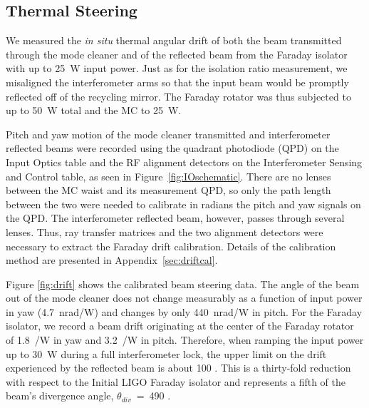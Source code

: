 \subsection{Thermal Steering}
We measured the \emph{in situ} thermal angular drift of both the beam
transmitted through the mode cleaner and of the reflected beam from
the Faraday isolator with up to 25~W input power. Just as for the
isolation ratio measurement, we misaligned the interferometer arms so
that the input beam would be promptly reflected off of the recycling
mirror. The Faraday rotator was thus subjected to up to 50~W total
and the MC to 25~W. 

Pitch and yaw motion of the mode cleaner transmitted and
interferometer reflected beams were recorded using the quadrant
photodiode (QPD) on the Input Optics table and the RF alignment
detectors on the Interferometer Sensing and Control table, as seen in
Figure~\ref{fig:IOschematic}. There are no lenses between the MC waist
and its measurement QPD, so only the path length between the two were
needed to calibrate in radians the pitch and yaw signals on the
QPD. The interferometer reflected beam, however, passes through
several lenses. Thus, ray transfer matrices and the two alignment
detectors were necessary to extract the Faraday drift
calibration. Details of the calibration method are presented in
Appendix~\ref{sec:driftcal}.

Figure \ref{fig:drift} shows the calibrated beam steering data. The
angle of the beam out of the mode cleaner does not change measurably
as a function of input power in yaw (4.7~nrad/W) and changes by only
440~nrad/W in pitch. For the Faraday isolator, we record a beam drift
originating at the center of the Faraday rotator of 1.8~\microrad/W in
yaw and 3.2~\microrad/W in pitch. Therefore, when ramping the input
power up to 30~W during a full interferometer lock, the upper limit on
the drift experienced by the reflected beam is about 100
\microrad. This is a thirty-fold reduction with respect to the Initial
LIGO Faraday isolator and represents a fifth of the beam's divergence
angle, $\theta_{div}$~=~490 \microrad.

